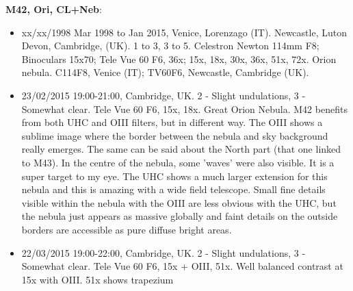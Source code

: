 {\bf M42, Ori, CL+Neb}:
\begin{itemize}
\item xx/xx/1998 Mar 1998 to Jan 2015, Venice, Lorenzago (IT). Newcastle, Luton Devon, Cambridge, (UK). 1 to 3, 3 to 5. Celestron Newton 114mm F8; Binoculars 15x70; Tele Vue 60 F6, 36x; 15x, 18x, 30x, 36x, 51x, 72x. Orion nebula. C114F8, Venice (IT); TV60F6, Newcastle, Cambridge (UK).
\item 23/02/2015 19:00-21:00, Cambridge, UK. 2 - Slight undulations, 3 - Somewhat clear. Tele Vue 60 F6, 15x, 18x. Great Orion Nebula. M42 benefits from both UHC and OIII filters, but in different way. The OIII shows a sublime image where the border between the nebula and sky background really emerges. The same can be said about the North part (that one linked to M43). In the centre of the nebula, some 'waves' were also visible. It is a super target to my eye. The UHC shows a much larger extension for this nebula and this is amazing with a wide field telescope. Small fine details visible within the nebula with the OIII are less obvious with the UHC, but the nebula just appears as massive globally and faint details on the outside borders are accessible as pure diffuse bright areas. 
\item 22/03/2015 19:00-22:00, Cambridge, UK. 2 - Slight undulations, 3 - Somewhat clear. Tele Vue 60 F6, 15x + OIII, 51x. Well balanced contrast at 15x with OIII. 51x shows trapezium
\end{itemize}
